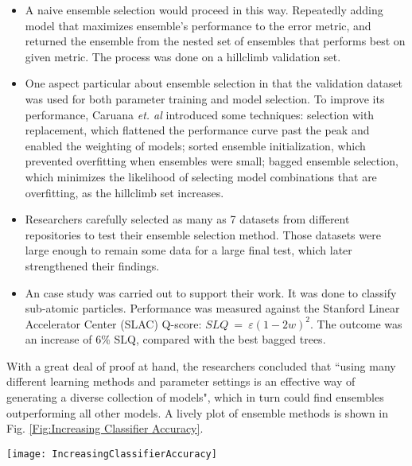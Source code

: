 \documentclass[journal]{IEEEtran}
\begin{document}
\begin{itemize}
  \item A naive ensemble selection would proceed in this way. Repeatedly adding model that maximizes ensemble's performance to the error metric, and returned the ensemble from the nested set of ensembles that performs best on given metric. The process was done on a hillclimb validation set.
  \item One aspect particular about ensemble selection in that the validation dataset was used for both parameter training and model selection. To improve its performance, Caruana \emph{et. al} introduced some techniques: selection with replacement, which flattened the performance curve past the peak and enabled the weighting of models; sorted ensemble initialization, which prevented overfitting when ensembles were small; bagged ensemble selection, which minimizes the likelihood of selecting model combinations that are overfitting, as the hillclimb set increases.
  \item Researchers carefully selected as many as 7 datasets from different repositories to test their ensemble selection method. Those datasets were large enough to remain some data for a large final test, which later strengthened their findings.
  \item An case study was carried out to support their work. It was done to classify sub-atomic particles. Performance was measured against the Stanford Linear Accelerator Center (SLAC) Q-score: $SLQ~=~\varepsilon(1-2w)^{2}$. The outcome was an increase of 6\% SLQ, compared with the best bagged trees.
\end{itemize}
With a great deal of proof at hand, the researchers concluded that ``using many different learning methods and parameter settings is an effective way of generating a diverse collection of models", which in turn could find ensembles outperforming all other models. A lively plot of ensemble methods is shown in Fig. \ref{Fig:Increasing Classifier Accuracy}.
\begin{figure*}[!t]
\centering
\texttt{[image: IncreasingClassifierAccuracy]}
\caption{\textbf{Increasing classifier accuracy:} A set of classification models $M_{1},M_{2},\ldots,M_{k}$ are generated by ensemble methods. And each classifier Source: \cite{Ref:AnalysisOfTheKDDCup2009}.}
\label{Fig:Increasing Classifier Accuracy}
\vspace*{4pt}
\end{figure*}
\end{document}
